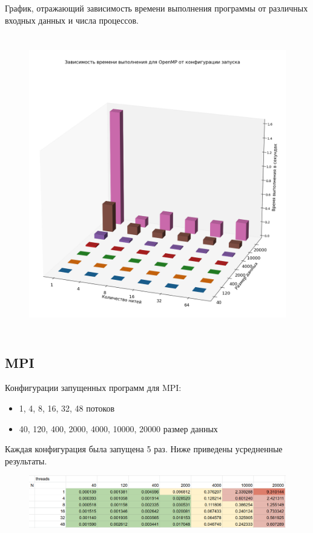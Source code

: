 \documentclass{article}
\begin{document}
График, отражающий зависимость времени выполнения программы от различных входных данных и числа процессов.

\begin{figure}[H]
    \centering
    \includegraphics[scale = 0.35,width=15cm,height=13cm]{omp_plot.png}
\end{figure}

\subsection{MPI}

\vspace{0.5cm}
Конфигурации запущенных программ для MPI:
\begin{itemize}
    \item 1, 4, 8, 16, 32, 48 потоков
    \item 40, 120, 400, 2000, 4000, 10000, 20000 размер данных
\end{itemize}

Каждая конфигурация была запущена 5 раз. Ниже приведены усредненные результаты.

\begin{figure}[H]
    \centering
    \includegraphics[scale = 0.3]{mpi_res.png}
\end{figure}
\end{document}
